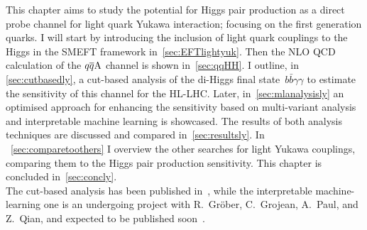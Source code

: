 This chapter aims to study the potential for Higgs pair production as a direct probe channel for light quark Yukawa interaction; focusing on the first generation quarks.  I will start by introducing the inclusion of light quark couplings to the Higgs in the SMEFT framework in~\autoref{sec:EFTlightyuk}. Then the NLO QCD calculation of the $q\overline q \rm A$ channel is shown in~\autoref{sec:qqHH}. I outline, in \autoref{sec:cutbasedly},  a cut-based analysis of the di-Higgs final state~$ b \bar b \gamma \gamma$ to estimate the sensitivity of this channel for the HL-LHC. Later, in~\autoref{sec:mlanalysisly} an optimised approach for enhancing the sensitivity based on multi-variant analysis and interpretable machine learning is showcased. The results of both analysis techniques are discussed and compared in~\autoref{sec:resultsly}. In ~\autoref{sec:comparetoothers} I overview the other searches for light Yukawa couplings, comparing them to the Higgs pair production sensitivity. This chapter is concluded in~\autoref{sec:concly}. \\ The cut-based analysis has been published in~\cite{Alasfar:2019pmn}, while the interpretable machine-learning one is an undergoing project with R.~Gr\"ober, C.~Grojean, A.~Paul, and Z.~Qian, and expected to be published soon~\cite{IML}. 

